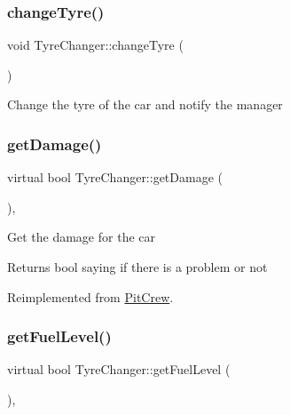 \subsubsection{\texorpdfstring{change\+Tyre()}{changeTyre()}}
{\footnotesize\ttfamily void Tyre\+Changer\+::change\+Tyre (\begin{DoxyParamCaption}{ }\end{DoxyParamCaption})\hspace{0.3cm}{\ttfamily [inline]}}

Change the tyre of the car and notify the manager \mbox{\label{class_tyre_changer_ac0ad98b08d6016010a6bfed58442b78c}} 
\subsubsection{\texorpdfstring{get\+Damage()}{getDamage()}}
{\footnotesize\ttfamily virtual bool Tyre\+Changer\+::get\+Damage (\begin{DoxyParamCaption}{ }\end{DoxyParamCaption})\hspace{0.3cm}{\ttfamily [inline]}, {\ttfamily [virtual]}}

Get the damage for the car \begin{DoxyReturn}{Returns}
bool saying if there is a problem or not 
\end{DoxyReturn}


Reimplemented from \mbox{\hyperlink{class_pit_crew_a0cd6a3161f5b016241b3a6a51d526c4f}{Pit\+Crew}}.

\mbox{\label{class_tyre_changer_ad369d1e8e5e356b297c904be374b045c}} 
\subsubsection{\texorpdfstring{get\+Fuel\+Level()}{getFuelLevel()}}
{\footnotesize\ttfamily virtual bool Tyre\+Changer\+::get\+Fuel\+Level (\begin{DoxyParamCaption}{ }\end{DoxyParamCaption})\hspace{0.3cm}{\ttfamily [inline]}, {\ttfamily [virtual]}}

